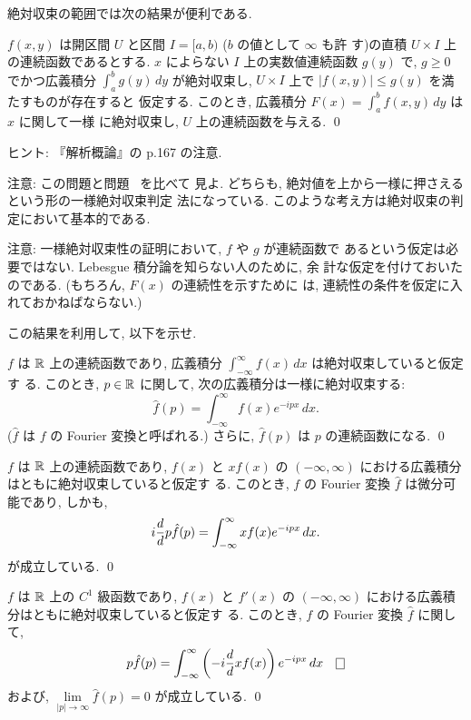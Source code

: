 \documentclass[12pt,twoside]{jarticle}
\begin{document}
絶対収束の範囲では次の結果が便利である.

\begin{question}[一様絶対収束の判定法]\label{q:unif-abs-conv-int}
  $f(x,y)$ は開区間 $U$ と区間 $I=[a,b)$ ($b$ の値として $\infty$ も許
  す)の直積 $U\times I$ 上の連続函数であるとする. $x$ によらない $I$ %
  上の実数値連続函数 $g(y)$ で, %
  $g \ge 0$ でかつ広義積分 $\int_a^b g(y)\,dy$ が絶対収束し, %
  $U\times I$ 上で $|f(x,y)| \le g(y)$ を満たすものが存在すると
  仮定する. %
  このとき, 広義積分 $F(x) = \int_a^b f(x,y) \,dy$ は $x$ に関して一様
  に絶対収束し, $U$ 上の連続函数を与える. \qed
\end{question}

\noindent ヒント: 『解析概論』の p.167 の注意.

\noindent 注意: この問題と問題 \ を比べて
見よ. どちらも, 絶対値を上から一様に押さえるという形の一様絶対収束判定
法になっている. このような考え方は絶対収束の判定において基本的である.

\noindent 注意: 一様絶対収束性の証明において, $f$ や $g$ が連続函数で
あるという仮定は必要ではない. Lebesgue 積分論を知らない人のために, 余
計な仮定を付けておいたのである. (もちろん, $F(x)$ の連続性を示すために
は, 連続性の条件を仮定に入れておかねばならない.)

この結果を利用して, 以下を示せ.

\begin{question}[Fourier変換の定義]
  $f$ は ${\mathbb R}$ 上の連続函数であり, %
  広義積分 $\int_{-\infty}^\infty f(x)\,dx$ は絶対収束していると仮定す
  る. このとき, $p\in{\mathbb R}$ に関して, 次の広義積分は一様に絶対収束する:
  \[
     \hat{f}(p) = \int_{-\infty}^\infty f(x) e^{-ipx} \,dx.
  \]%
  ($\hat{f}$ は $f$ の Fourier 変換と呼ばれる.) さらに, $\hat{f}(p)$ %
  は $p$ の連続函数になる. \qed
\end{question}

\begin{question}
  $f$ は ${\mathbb R}$ 上の連続函数であり, $f(x)$ と $xf(x)$ の %
  $(-\infty,\infty)$ における広義積分はともに絶対収束していると仮定す
  る. このとき, $f$ の Fourier 変換 $\hat{f}$ は微分可能であり, しかも,
  \[
    i \frac{d}{d }{p} \hat{f}(p)
    =
    \int_{-\infty}^\infty x f(x) e^{-ipx} \,dx.
  \]
  が成立している. \qed
\end{question}

\begin{question}
  $f$ は ${\mathbb R}$ 上の $C^1$ 級函数であり, $f(x)$ と $f'(x)$ の %
  $(-\infty,\infty)$ における広義積分はともに絶対収束していると仮定す
  る. このとき, $f$ の Fourier 変換 $\hat{f}$ に関して, 
  \[
    p \hat{f}(p)
    =
    \int_{-\infty}^\infty \left( -i\od{}{x}f(x) \right) e^{-ipx} \,dx
  \qed
  \]
  および, $\lim\limits_{|p|\to\infty} \hat{f}(p) = 0$ が成立している. 
  \qed
\end{question}
\end{document}
